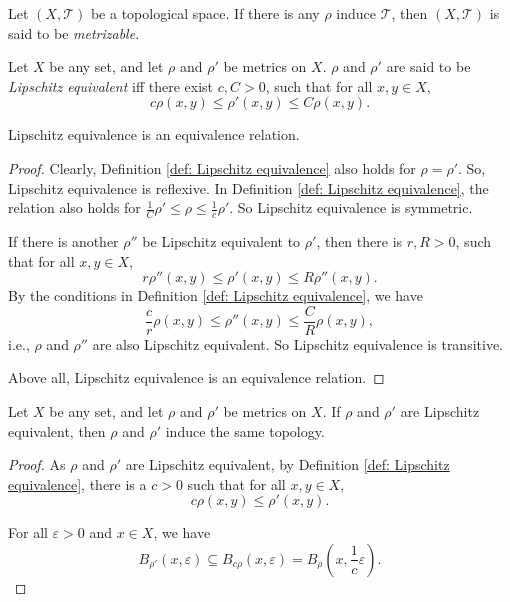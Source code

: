 \begin{definition}
	\label{def: metrizable spaces}
	Let $(X, \mathcal T)$ be a topological space. If there is any $\rho$ induce $\mathcal T$, then $(X, \mathcal T)$ is said to be \textit{metrizable}.
\end{definition}


\begin{definition}
	\label{def: Lipschitz equivalence}
	Let $X$ be any set, and let $\rho$ and $\rho'$ be metrics on $X$. $\rho$ and $\rho'$ are said to be \textit{Lipschitz equivalent} iff there exist $c, C > 0$, such that for all $x,y \in X$,
	$$
	c \rho(x,y) \le \rho'(x,y) \le C \rho(x,y).
	$$
\end{definition}


\begin{proposition}
	\label{prop: Lipschitz equivalence is a equivalence relation}
	Lipschitz equivalence is an equivalence relation.
	
	\begin{proof}
		Clearly, Definition \ref{def: Lipschitz equivalence} also holds for $\rho = \rho'$. So, Lipschitz equivalence is reflexive. In Definition \ref{def: Lipschitz equivalence}, the relation also holds for $\frac{1}{C} \rho' \le \rho \le \frac{1}{c} \rho'$. So Lipschitz equivalence is symmetric.
		
		If there is another $\rho''$ be Lipschitz equivalent to $\rho'$, then there is $r, R > 0$, such that for all $x,y \in X$,
		$$
		r\rho''(x,y) \le \rho'(x,y) \le R\rho''(x,y).
		$$
		By the conditions in Definition \ref{def: Lipschitz equivalence}, we have
		$$
		\frac{c}{r} \rho(x,y) \le \rho''(x,y) \le  \frac{C}{R} \rho(x,y),
		$$
		i.e., $\rho$ and $\rho''$ are also Lipschitz equivalent. So Lipschitz equivalence is transitive.
		
		Above all, Lipschitz equivalence is an equivalence relation.
	\end{proof}
\end{proposition}


\begin{proposition}
	\label{prop: Lipschitz equivalent metrics induces the same topology}
	Let $X$ be any set, and let $\rho$ and $\rho'$ be metrics on $X$. If $\rho$ and $\rho'$ are Lipschitz equivalent, then $\rho$ and $\rho'$ induce the same topology.
	
	\begin{proof}
		As $\rho$ and $\rho'$ are Lipschitz equivalent, by Definition \ref{def: Lipschitz equivalence}, there is a $c > 0$ such that for all $x,y \in X$,
		$$
		c \rho(x,y) \le \rho'(x,y).
		$$
		
		For all $\varepsilon > 0$ and $x \in X$, we have
		$$
		B_{\rho'}(x, \varepsilon) \subseteq B_{c \rho}(x, \varepsilon) = B_\rho \left( x, \frac{1}{c} \varepsilon \right).
		$$
		
	\end{proof}
\end{proposition}


